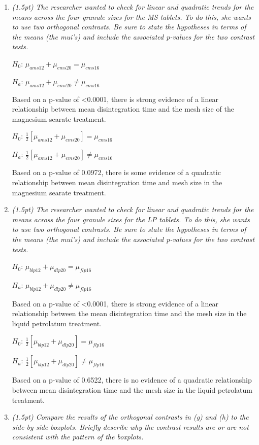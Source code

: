 \documentclass{article}\usepackage[]{graphicx}\usepackage[]{color}
\begin{document}
\begin{enumerate}
\begin{enumerate}
\item 
{\it  (1.5pt) The researcher wanted to check for linear and quadratic trends for the means across the four granule sizes for the MS tablets. To do this, she wants to use two orthogonal contrasts. Be sure to state the hypotheses in terms of the means (the mui's) and include the associated p-values for the two contrast tests.}

$H_{0}$: $\mu_{ams12} + \mu_{ems20} = \mu_{cms16}$

$H_{a}$: $\mu_{ams12} + \mu_{ems20} \neq \mu_{cms16}$ 

Based on a p-value of \textless 0.0001, there is strong evidence of a linear relationship between mean disintegration time and the mesh size of the magnesium searate treatment.

$H_{0}$: $\frac{1}{2}[\mu_{ams12} + \mu_{ems20}] = \mu_{cms16}$

$H_{a}$: $\frac{1}{2}[\mu_{ams12} + \mu_{ems20}] \neq \mu_{cms16}$ 

Based on a p-value of 0.0972, there is some evidence of a quadratic relationship between mean disintegration time and mesh size in the magnesium searate treatment.


\item
{\it  (1.5pt) The researcher wanted to check for linear and quadratic trends for the means across the four granule sizes for the LP tablets. To do this, she wants to use two orthogonal contrasts. Be sure to state the hypotheses in terms of the means (the mui's) and include the associated p-values for the two contrast tests.}

$H_{0}$: $\mu_{blp12} + \mu_{dlp20} = \mu_{flp16}$

$H_{a}$: $\mu_{blp12} + \mu_{dlp20} \neq \mu_{flp16}$

Based on a p-value of \textless 0.0001, there is strong evidence of a linear relationship between the mean disintegration time and the mesh size in the liquid petrolatum treatment.

$H_{0}$: $\frac{1}{2}[\mu_{blp12} + \mu_{dlp20}] = \mu_{flp16}$

$H_{a}$: $\frac{1}{2}[\mu_{blp12} + \mu_{dlp20}] \neq \mu_{flp16}$

Based on a p-value of 0.6522, there is no evidence of a quadratic relationship between mean disintegration time and the mesh size in the liquid petrolatum treatment. 


\item 
{\it (1.5pt) Compare the results of the orthogonal contrasts in (g) and (h) to the side-by-side boxplots. Briefly describe why the contrast results are or are not consistent with the pattern of the boxplots.}




\end{enumerate}
\end{enumerate}
\end{document}

